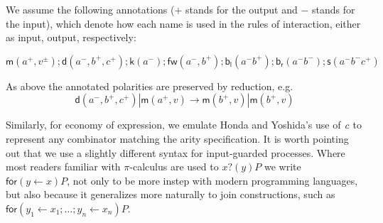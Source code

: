 \documentclass[submission,copyright,creativecommons]{eptcs}
\newcommand{\pic}{$\pi$-calculus}
\newcommand{\binpar}[2]{#1 | #2}
\theoremstyle{definition}
\theoremstyle{remark}
\theoremstyle{remark}
\begin{document}
We assume the following annotations ($+$ stands for the output and $-$
stands for the input), which denote how each name is used in the rules
of interaction, either as input, output, respectively:

\[\mathsf{m}(a^{+},v^{\pm});\mathsf{d}(a^{-},b^{+},c^{+});\mathsf{k}(a^{-});\mathsf{fw}(a^{-},b^{+});\mathsf{b}_{\mathsf{l}}(a^{-}b^{+});\mathsf{b}_{\mathsf{r}}(a^{-}b^{-});\mathsf{s}(a^{-}b^{-}c^{+})\]

As above the annotated polarities are preserved by reduction, e.g.
\[\binpar{\mathsf{d}(a^{-},b^{+},c^{+})}{\mathsf{m}(a^{+},v)} \to \binpar{\mathsf{m}(b^{+},v)}{\mathsf{m}(b^{+},v)}\]

Similarly, for economy of expression, we emulate Honda and Yoshida's
use of $\emph{c}$ to represent any combinator matching the arity
specification. It is worth pointing out that we use a slightly
different syntax for input-guarded processes. Where most readers
familiar with {\pic} are used to $x?(y)P$ we write $\mathsf{for}(y
\leftarrow x)P$, not only to be more instep with modern programming
languages, but also because it generalizes more naturally to join
constructions, such as $\mathsf{for}(y_1 \leftarrow x_1; \ldots; y_n
\leftarrow x_n)P$.
\end{document}
